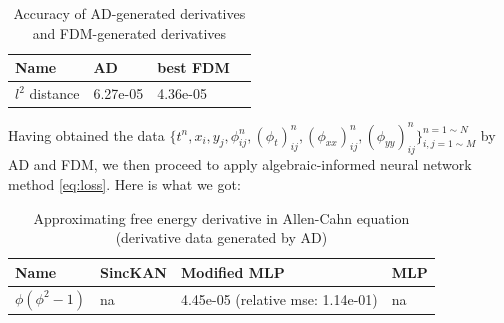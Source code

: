 \begin{table}[H]
    \centering
    \begin{tabular}{|l|l|l|l|}
         \hline Name&  AD&  best FDM\\
         \hline $l^2$ distance &  6.27e-05 &  4.36e-05\\
         \hline
    \end{tabular}
    \caption{Accuracy of AD-generated derivatives and FDM-generated derivatives}
    \label{tab:derivatives}
\end{table}
Having obtained the data \( \{t^{n}, x_{i}, y_{j}, \phi_{ij}^{n}, (\phi_{t})_{ij}^{n}, (\phi_{xx})_{ij}^{n}, (\phi_{yy})_{ij}^{n} \}^{n = 1 \sim N}_{i,j = 1 \sim M} \) by AD and FDM, we then proceed to apply algebraic-informed neural network method \cref{eq:loss}. Here is what we got:
\begin{table}[H]
    \centering
    \begin{tabular}{|l|l|l|l|}
         \hline Name&  SincKAN&  Modified MLP& MLP\\
         \hline $\phi (\phi^2 - 1)$ & na&  4.45e-05 (relative mse: 1.14e-01)& na\\
         \hline
    \end{tabular}
    \caption{Approximating free energy derivative in Allen-Cahn equation (derivative data generated by AD)}
    \label{tab:phitxy}
\end{table}






